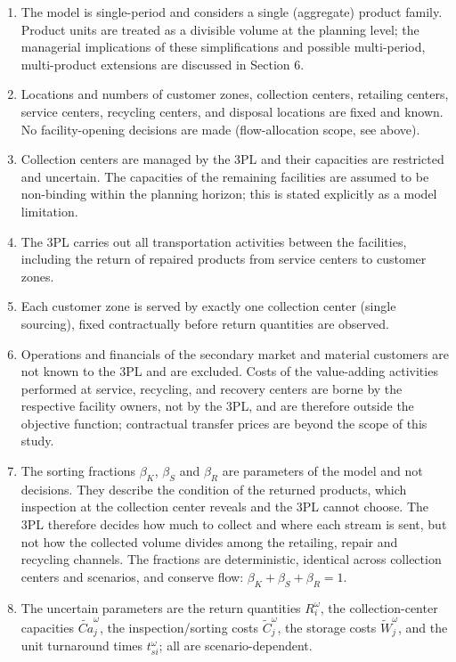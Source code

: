 \documentclass[11pt, a4paper]{article}
\begin{document}
\begin{enumerate}
\def\labelenumi{\arabic{enumi}.}
\item
  The model is single-period and considers a single (aggregate) product family. Product units are treated as a divisible volume at the planning level; the managerial implications of these simplifications and possible multi-period, multi-product extensions are discussed in Section 6.
\item
  Locations and numbers of customer zones, collection centers, retailing centers, service centers, recycling centers, and disposal locations are fixed and known. No facility-opening decisions are made (flow-allocation scope, see above).
\item
  Collection centers are managed by the 3PL and their capacities are restricted and uncertain. The capacities of the remaining facilities are assumed to be non-binding within the planning horizon; this is stated explicitly as a model limitation.
\item
  The 3PL carries out all transportation activities between the facilities, including the return of repaired products from service centers to customer zones.
\item
  Each customer zone is served by exactly one collection center (single sourcing), fixed contractually before return quantities are observed.
\item
  Operations and financials of the secondary market and material customers are not known to the 3PL and are excluded. Costs of the value-adding activities performed at service, recycling, and recovery centers are borne by the respective facility owners, not by the 3PL, and are therefore outside the objective function; contractual transfer prices are beyond the scope of this study.
\item
  The sorting fractions $\beta_{K}$, $\beta_{S}$ and $\beta_{R}$ are parameters of the model and not decisions. They describe the condition of the returned products, which inspection at the collection center reveals and the 3PL cannot choose. The 3PL therefore decides how much to collect and where each stream is sent, but not how the collected volume divides among the retailing, repair and recycling channels. The fractions are deterministic, identical across collection centers and scenarios, and conserve flow: $\beta_{K}+\beta_{S}+\beta_{R} = 1$.
\item
  The uncertain parameters are the return quantities $R_i^{\omega}$, the collection-center capacities $\widetilde{Ca}_j^{\omega}$, the inspection/sorting costs $\widetilde{C}_j^{\omega}$, the storage costs $\widetilde{W}_j^{\omega}$, and the unit turnaround times $t_{si}^{\omega}$; all are scenario-dependent.
\end{enumerate}
\end{document}
